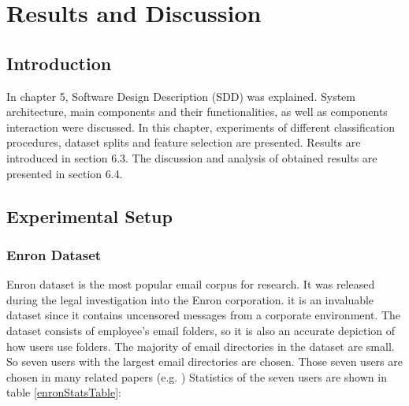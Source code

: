 
\chapter{Results and Discussion} %

\label{Chapter6} %




\section{Introduction}
In chapter 5, Software Design Description (SDD) was explained. System architecture, main components and their functionalities, as well as components interaction were discussed. In this chapter, experiments of different classification procedures, dataset splits and feature selection are presented. Results are introduced in section 6.3. The discussion and analysis of obtained results are presented in section 6.4.


\section{Experimental Setup}

\subsection{Enron Dataset}
Enron dataset is the most popular email corpus for research. It was released during the legal investigation into the Enron corporation.
it is an invaluable dataset since it contains uncensored messages from a corporate environment. The dataset consists of employee’s email folders, so it is also an accurate depiction of how users use folders. The majority of email directories in the dataset are small. So seven users with the largest email directories are chosen. Those seven users are chosen in many related papers (e.g. ) %
Statistics of the seven users are shown in table \ref{enronStatsTable}:


